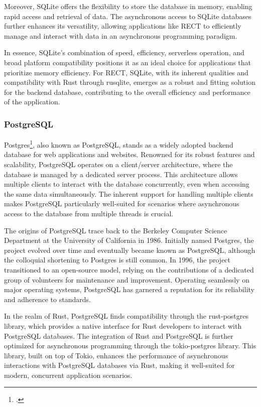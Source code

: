 Moreover, SQLite offers the flexibility to store the database in memory, enabling rapid access and retrieval of data. The asynchronous access to SQLite 
databases further enhances its versatility, allowing applications like RECT to efficiently manage and interact with data in an asynchronous programming paradigm.\newline

In essence, SQLite's combination of speed, efficiency, serverless operation, and broad platform compatibility positions it as an ideal choice for applications 
that prioritize memory efficiency. For RECT, SQLite, with its inherent qualities and compatibility with Rust through rusqlite, emerges as a robust and fitting 
solution for the backend database, contributing to the overall efficiency and performance of the application.

\subsubsection{PostgreSQL}
Postgres\footcite{postgres}, also known as PostgreSQL, stands as a widely adopted backend database for web applications and websites. Renowned for its robust 
features and scalability, PostgreSQL operates on a client/server architecture, where the database is managed by a dedicated server process. This architecture 
allows multiple clients to interact with the database concurrently, even when accessing the same data simultaneously. The inherent support for handling multiple 
clients makes PostgreSQL particularly well-suited for scenarios where asynchronous access to the database from multiple threads is crucial.\newline

The origins of PostgreSQL trace back to the Berkeley Computer Science Department at the University of California in 1986. Initially named Postgres, the project 
evolved over time and eventually became known as PostgreSQL, although the colloquial shortening to Postgres is still common. In 1996, the project transitioned 
to an open-source model, relying on the contributions of a dedicated group of volunteers for maintenance and improvement. Operating seamlessly on major 
operating systems, PostgreSQL has garnered a reputation for its reliability and adherence to standards.\newline

In the realm of Rust, PostgreSQL finds compatibility through the rust-postgres library, which provides a native interface for Rust developers to interact with 
PostgreSQL databases. The integration of Rust and PostgreSQL is further optimized for asynchronous programming through the tokio-postgres library. This library, 
built on top of Tokio, enhances the performance of asynchronous interactions with PostgreSQL databases via Rust, making it well-suited for modern, concurrent 
application scenarios.\newline

